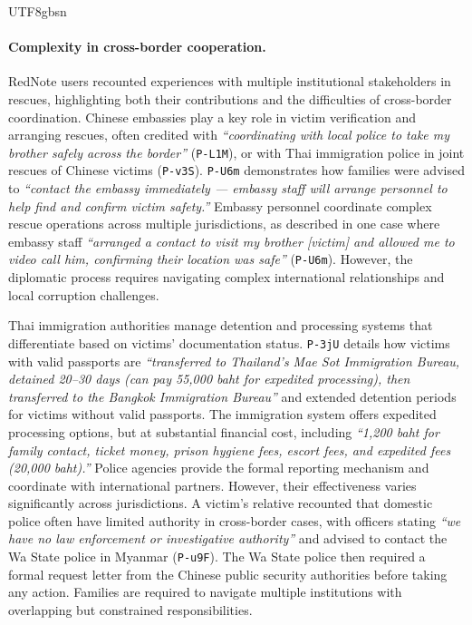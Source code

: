 \documentclass[sigconf,nonacm]{acmart}
\begin{document}
\begin{CJK}{UTF8}{gbsn}
\paragraph{\textbf{Complexity in cross-border cooperation.}}
RedNote users recounted experiences with multiple institutional stakeholders in rescues, highlighting both their contributions and the difficulties of cross-border coordination. Chinese embassies play a key role in victim verification and arranging rescues, often credited with \textit{``coordinating with local police to take my brother safely across the border''} (\texttt{P-L1M}), or with Thai immigration police in joint rescues of Chinese victims (\texttt{P-v3S}). \texttt{P-U6m} demonstrates how families were advised to \textit{``contact the embassy immediately --- embassy staff will arrange personnel to help find and confirm victim safety.''} Embassy personnel coordinate complex rescue operations across multiple jurisdictions, as described in one case where embassy staff \textit{``arranged a contact to visit my brother [victim] and allowed me to video call him, confirming their location was safe''} (\texttt{P-U6m}). However, the diplomatic process requires navigating complex international relationships and local corruption challenges.

Thai immigration authorities manage detention and processing systems that differentiate based on victims' documentation status. \texttt{P-3jU} details how victims with valid passports are \textit{``transferred to Thailand's Mae Sot Immigration Bureau, detained 20--30 days (can pay 55,000 baht for expedited processing), then transferred to the Bangkok Immigration Bureau''} and extended detention periods for victims without valid passports. The immigration system offers expedited processing options, but at substantial financial cost, including \textit{``1,200 baht for family contact, ticket money, prison hygiene fees, escort fees, and expedited fees (20,000 baht).''} Police agencies provide the formal reporting mechanism and coordinate with international partners. However, their effectiveness varies significantly across jurisdictions. A victim's relative recounted that domestic police often have limited authority in cross-border cases, with officers stating \textit{``we have no law enforcement or investigative authority''} and advised to contact the Wa State police in Myanmar (\texttt{P-u9F}). The Wa State police then required a formal request letter from the Chinese public security authorities before taking any action. Families are required to navigate multiple institutions with overlapping but constrained responsibilities.


\end{CJK}
\end{document}
